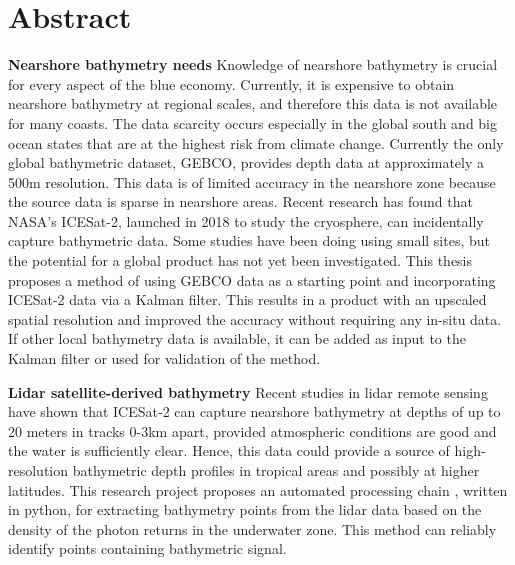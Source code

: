 \chapter*{Abstract}

\noindent\textbf{Nearshore bathymetry needs} Knowledge of nearshore bathymetry is crucial for every aspect of the blue economy. Currently, it is expensive to obtain nearshore bathymetry at regional scales, and therefore this data is not available for many coasts. The data scarcity occurs especially in the global south and big ocean states that are at the highest risk from climate change. Currently the only global bathymetric dataset, GEBCO, provides depth data at approximately a 500m resolution. This data is of limited accuracy in the nearshore zone because the source data is sparse in nearshore areas. Recent research has found that NASA's ICESat-2, launched in 2018 to study the cryosphere, can incidentally capture bathymetric data. Some studies have been doing using small sites, but the potential for a global product has not yet been investigated. This thesis proposes a method of using GEBCO data as a starting point and incorporating ICESat-2 data via a Kalman filter. This results in a product with an upscaled spatial resolution and improved the accuracy without requiring any in-situ data. If other local bathymetry data is available, it can be added as input to the Kalman filter or used for validation of the method. 


\noindent\textbf{Lidar satellite-derived bathymetry} Recent studies in lidar remote sensing have shown that ICESat-2 can capture nearshore bathymetry at depths of up to 20 meters in tracks 0-3km apart, provided atmospheric conditions are good and the water is sufficiently clear. Hence, this data could provide a source of high-resolution bathymetric depth profiles in tropical areas and possibly at higher latitudes. This research project proposes an automated processing chain , written in python, for extracting bathymetry points from the lidar data based on the density of the photon returns in the underwater zone. This method can reliably identify points containing bathymetric signal. 


